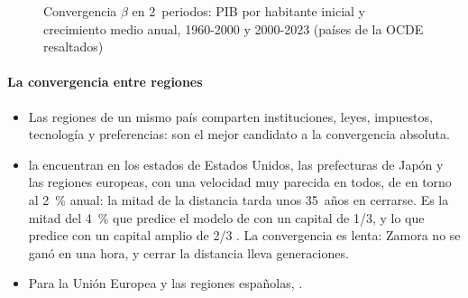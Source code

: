 \documentclass[11pt]{article}
\begin{document}
\begin{figure}[H]
\centering
\caption{Convergencia $\beta$ en 2~periodos: PIB por habitante inicial y crecimiento medio anual, 1960-2000 y 2000-2023 (países de la OCDE resaltados)}\label{fig:convergencia-periodos}
\end{figure}
\paragraph{La convergencia entre regiones}

\begin{itemize}
\item Las regiones de un mismo país comparten instituciones, leyes, impuestos, tecnología y preferencias: son el mejor candidato a la convergencia absoluta.
\item \textcite{BarroSalaiMartin1991,BarroSalaiMartin1992} la encuentran en los estados de Estados Unidos, las prefecturas de Japón y las regiones europeas, con una velocidad muy parecida en todos, de en torno al 2~\% anual: la mitad de la distancia tarda unos 35~años en cerrarse\nocite{BarroSalaiMartin2004}. Es la mitad del 4~\% que predice el modelo de  con un capital de 1/3, y lo que predice con un capital amplio de 2/3 . La convergencia es lenta: Zamora no se ganó en una hora, y cerrar la distancia lleva generaciones.
\item Para la Unión Europea y las regiones españolas,   .
\end{itemize}
\end{document}
